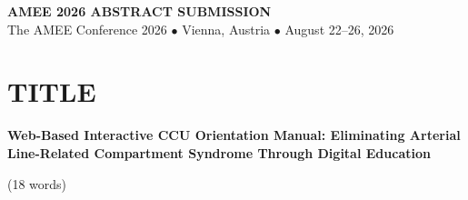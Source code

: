 \documentclass[11pt,a4paper]{article}
\begin{document}
\begin{center}
    \colorbox{navyblue}{%
        \parbox{0.95\textwidth}{%
            \centering
            \vspace{0.8em}
            {\Large\bfseries\color{white}AMEE 2026 ABSTRACT SUBMISSION}\\[0.3em]
            {\normalsize\color{white}The AMEE Conference 2026 $\bullet$ Vienna, Austria $\bullet$ August 22--26, 2026}\\[0.3em]
            \vspace{0.5em}
        }%
    }
\end{center}

\vspace{1em}

\begin{center}
\end{center}

\vspace{1.5em}

\section*{TITLE}

{\Large\bfseries\color{navyblue}
Web-Based Interactive CCU Orientation Manual: Eliminating Arterial Line-Related Compartment Syndrome Through Digital Education
}

\vspace{0.3em}
{\small\color{textgray}(18 words)}

\vspace{1.5em}

\end{document}
